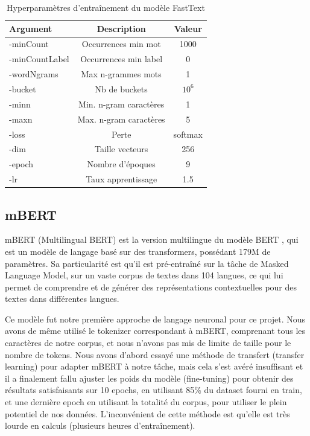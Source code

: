\begin{table}[h]
    \centering
    \small
    \begin{tabular}{lcc}
        \hline
        \textbf{Argument} & \textbf{Description} & \textbf{Valeur} \\
        \hline
        -minCount & Occurrences min mot & 1000 \\
        -minCountLabel & Occurrences min label & 0 \\
        -wordNgrams & Max n-grammes mots & 1 \\
        -bucket & Nb de buckets & $10^6$ \\
        -minn & Min. n-gram caractères & 1 \\
        -maxn & Max. n-gram caractères & 5 \\
        -loss & Perte & softmax \\
        -dim & Taille vecteurs & 256 \\
        -epoch & Nombre d'époques & 9 \\
        -lr & Taux apprentissage & 1.5 \\
        \hline
    \end{tabular}
    \caption{Hyperparamètres d'entraînement du modèle FastText}
    \label{tab:glotlid-m-hyperparams}
\end{table}

\subsection{mBERT}

mBERT (Multilingual BERT) est la version multilingue du modèle BERT \cite{devlin2019bert}, qui est un modèle de langage basé sur des transformers, possédant 179M de paramètres. Sa particularité est qu'il est pré-entraîné sur la tâche de Masked Language Model, sur un vaste corpus de textes dans 104 langues, ce qui lui permet de comprendre et de générer des représentations contextuelles pour des textes dans différentes langues.

Ce modèle fut notre première approche de langage neuronal pour ce projet.  Nous avons de même utilisé le tokenizer correspondant à mBERT, comprenant tous les caractères de notre corpus, et nous n'avons pas mis de limite de taille pour le nombre de tokens. Nous avons d'abord essayé une méthode de transfert (transfer learning) pour adapter mBERT à notre tâche, mais cela s'est avéré insuffisant et il a finalement fallu ajuster les poids du modèle (fine-tuning) pour obtenir des résultats satisfaisants sur 10 epochs, en utilisant 85\% du dataset fourni en train, et une dernière epoch en utilisant la totalité du corpus, pour utiliser le plein potentiel de nos données. L'inconvénient de cette méthode est qu'elle est très lourde en calculs (plusieurs heures d'entraînement).

